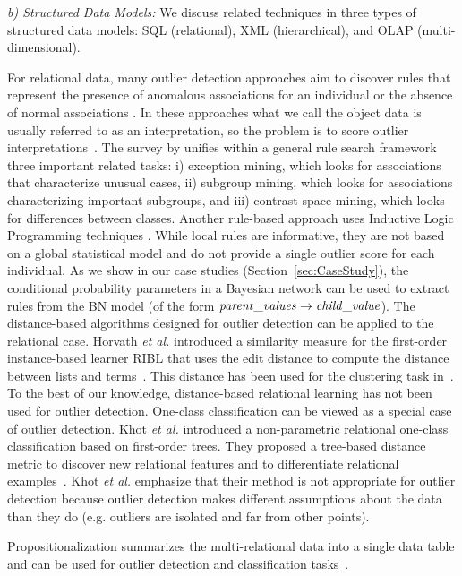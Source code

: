 {				\textit{b) Structured Data Models:} We discuss related techniques in three types of structured data models: SQL (relational), XML (hierarchical), and OLAP (multi-dimensional). 
				
				For relational data, many outlier detection approaches aim to discover rules that represent the presence of anomalous associations for an individual or the absence of normal associations \citep{Maervoet2012,Gao2010}.    In these approaches what we call the object data is usually referred to as an interpretation, so the problem is to score outlier interpretations~\citep{Maervoet2012}. The survey by \citep{Novak2009} unifies within a general rule search framework three important related tasks: i) exception mining, which looks for associations that characterize unusual cases, ii) subgroup mining, which looks for associations  characterizing important subgroups, and iii) contrast space mining, which looks for differences between classes. Another rule-based approach uses Inductive Logic Programming techniques \citep{Angiulli2007}.
				While local rules are informative, they are not based on a global statistical model and do not provide a single outlier score for each individual. As we show in our case studies (Section~\ref{sec:CaseStudy}), the conditional probability parameters in a Bayesian network can be used to extract rules  from the BN model (of the form $\it{parent\_values} \rightarrow \it{child\_value}$).
				The distance-based algorithms designed for outlier detection can be applied to the relational case.  Horvath {\em et al.} introduced a similarity measure for the first-order instance-based learner RIBL that uses the edit distance to compute the distance between lists and terms~\citep{Horvath2001}. This distance has been used for the clustering task in~\citep{Kirsten2001}. To the best of our knowledge, distance-based relational learning has not been used for outlier detection. One-class classification can be viewed as a special case of outlier detection.  Khot {\em et al.} introduced a non-parametric relational one-class classification based on first-order trees. They proposed a tree-based distance metric to discover new relational features and to differentiate relational examples~\citep{Khot2014}. Khot {\em et al.} emphasize that their method is not appropriate for outlier detection because outlier detection makes different assumptions about the data than they do (e.g. outliers are isolated and far from other points).  
				
				 Propositionalization summarizes the multi-relational data into a single data table and can be used for outlier detection and classification tasks~\citep{Kramer2000,Lavrac13,kuzelka2008,Riahi2016,AndersonP08}. 
				
}
